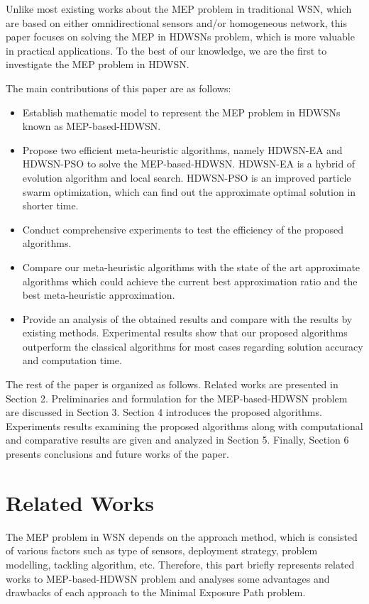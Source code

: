\documentclass[final]{elsarticle}
\begin{document}
Unlike most existing works about the MEP problem in traditional WSN, which are based on either omnidirectional sensors and/or homogeneous network, this paper focuses on solving the MEP in HDWSNs problem, which is more valuable in practical applications. To the best of our knowledge, we are the first to investigate the MEP problem in HDWSN.

The main contributions of this paper are as follows:
\begin{itemize}
	\itemsep0em
	\item Establish mathematic model to represent the MEP problem in HDWSNs known as MEP-based-HDWSN.
	\item Propose two efficient meta-heuristic algorithms, namely HDWSN-EA and HDWSN-PSO to solve the MEP-based-HDWSN. HDWSN-EA is a hybrid of evolution algorithm and local search. HDWSN-PSO is an improved particle swarm optimization, which can find out the approximate optimal solution in shorter time.
	\item Conduct comprehensive experiments to test the efficiency of the proposed algorithms.
	\item Compare our meta-heuristic algorithms with the state of the art approximate algorithms which could achieve the current best approximation ratio and the best meta-heuristic approximation.
	\item Provide an analysis of the obtained results and compare with the results by existing methods. Experimental results show that our proposed algorithms outperform the classical algorithms for most cases regarding solution accuracy and computation time.	
\end{itemize}

The rest of the paper is organized as follows. Related works are presented in Section 2. Preliminaries and formulation for the MEP-based-HDWSN problem are discussed in Section 3. Section 4 introduces the proposed algorithms. Experiments results examining the proposed algorithms along with computational and comparative results are given and analyzed in Section 5. Finally, Section 6 presents conclusions and future works of the paper.

\section{Related Works}
The MEP problem in WSN depends on the approach method, which is consisted of various factors such as type of sensors, deployment strategy, problem modelling, tackling algorithm, etc. Therefore, this part briefly represents related works to MEP-based-HDWSN problem and analyses some advantages and drawbacks of each approach to the Minimal Exposure Path problem.
\end{document}

